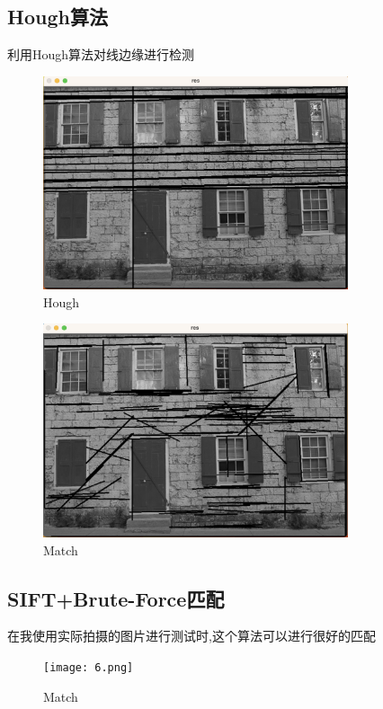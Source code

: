 \documentclass{article}
\begin{document}
\subsection*{Hough算法}
利用Hough算法对线边缘进行检测
\begin{figure}[H]
    \centering
    \includegraphics[width=0.8\textwidth]{4.png}
    \caption{\label{pr2}Hough}
    \end{figure}

    \begin{figure}[H]
        \centering
        \includegraphics[width=0.8\textwidth]{5.png}
        \caption{\label{pr2}Match}
        \end{figure}

\subsection*{SIFT+Brute-Force匹配 }
在我使用实际拍摄的图片进行测试时,这个算法可以进行很好的匹配
\begin{figure}[H]
    \centering
    \texttt{[image: 6.png]}
    \caption{\label{pr2}Match}
    \end{figure}
\end{document}
